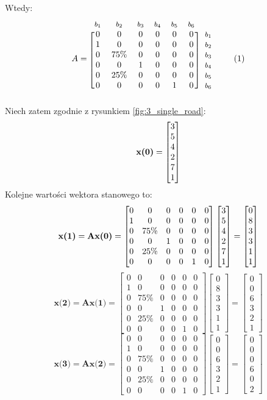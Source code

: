 \documentclass[12pt]{book}
\theoremstyle{plain}
\newcommand\addtag{\refstepcounter{equation}
\renewcommand{\labelenumii}{\theenumii}
\renewcommand{\theenumii}{\theenumi.\arabic{enumii}.}
\tag{\theequation}}
\begin{document}
Wtedy:
\def \A{
\begin{bmatrix}
	0 & 0    & 0 & 0 & 0 & 0 \\
	1 & 0    & 0 & 0 & 0 & 0 \\
	0 & 75\% & 0 & 0 & 0 & 0 \\
	0 & 0    & 1 & 0 & 0 & 0 \\
	0 & 25\% & 0 & 0 & 0 & 0 \\
	0 & 0    & 0 & 0 & 1 & 0 
\end{bmatrix}
}
\begin{equation*}
A=
\begin{blockarray}{*{6}{c} l}
\begin{block}{*{6}{>{$\footnotesize}c<{$}} l}
$b_1$ & $b_2$ & $b_3$ & $b_4$ & $b_5$ & $b_6$ \\
\end{block}
\begin{block}{[*{6}{c}]>{$\footnotesize}l<{$}}
0 & 0 & 0 & 0 & 0 & 0 & $b_1$ \\
1 & 0 & 0 & 0 & 0 & 0 & $b_2$ \\
0 & 75\% & 0 & 0 & 0 & 0 & $b_3$ \\
0 & 0 & 1 & 0 & 0 & 0 & $b_4$ \\
0 & 25\% & 0 & 0 & 0 & 0 & $b_5$ \\
0 & 0 & 0 & 0 & 1 & 0 & $b_6$ \\
\end{block}
\end{blockarray} \addtag
\end{equation*}
Niech zatem zgodnie z rysunkiem \ref{fig:3_single_road}:
\[\textbf{x(0)}=\begin{bmatrix} 3 \\ 5 \\ 4 \\ 2 \\ 7 \\ 1 \end{bmatrix} \]
Kolejne wartości wektora stanowego to:
\def \xI{\begin{bmatrix}
	0 \\ 8 \\ 3 \\ 3 \\ 1 \\ 1
\end{bmatrix}}
\def \xII{\begin{bmatrix}
		0 \\ 0 \\ 6 \\ 3 \\ 2 \\ 1
	\end{bmatrix}}
\def \xIII{\begin{bmatrix}
		0 \\ 0 \\ 0 \\ 6 \\ 0 \\ 2
\end{bmatrix}}
\[
\textbf{x(1)}=\textbf{Ax(0)}=\A \xzero = \xI
\]
\[
\textbf{x(2)}=\textbf{Ax(1)}=\A \xI = \xII
\]
\[
\textbf{x(3)}=\textbf{Ax(2)}=\A \xII = \xIII
\]
\end{document}
